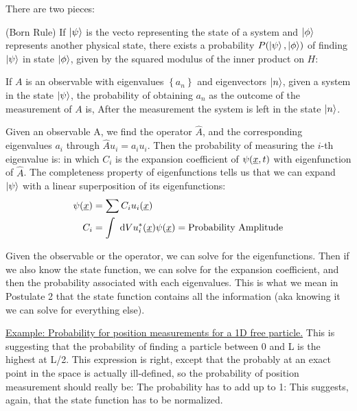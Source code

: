 \documentclass{school-22.101-notes}
\date{September 14, 2011}
\begin{document}
\maketitle


\begin{axiom}
There are two pieces:
\begin{subaxiom}
  (Born Rule) If $\left| \psi \right>$ is the vecto representing the state of a system and $\left| \phi \right>$ represents another physical state, there exists a probability $P(\left| \psi \right>, \left| \phi \right>)$ of finding $\left| \psi \right>$ in state $\left| \phi \right>$, given by the squared modulus of the inner product on $H$:
\end{subaxiom}
\begin{subaxiom}
  If $A$ is an observable with eigenvalues $\left\{ a_n \right\}$ and eigenvectors $\left| n \right>$, given a system in the state $\left| \psi \right>$, the probability of obtaining $a_n$ as the outcome of the measurement of $A$ is, 
  After the measurement the system is left in the state $\left| n \right>$.
\end{subaxiom}
\end{axiom}

Given an observable A, we find the operator $\hat{A}$, and the corresponding eigenvalues $a_i$ through $\hat{A} u_i = a_i u_i$. Then the probability of measuring the $i$-th eigenvalue is:
in which $C_i$ is the expansion coefficient of $\psi(\underline{x}, t)$ with eigenfunction of $\hat{A}$. The completeness property of eigenfunctions tells us that we can expand $\left| \psi \right>$ with a linear superposition of its eigenfunctions:
\begin{align}
\psi(\underline{x}) &= \displaystyle\sum C_i u_i (\underline{x}) \\
C_i &= \int \mbox{ }\mathrm{d} V u_i^* (\underline{x}) \psi(\underline{x}) = \mbox{Probability Amplitude}
\end{align}

Given the observable or the operator, we can solve for the eigenfunctions. Then if we also know the state function, we can solve for the expansion coefficient, and then the probability associated with each eigenvalues. This is what we mean in Postulate 2 that the state function contains all the information (aka knowing it we can solve for everything else). 

\uline{Example: Probability for position measurements for a 1D free particle.} 
This is suggesting that the probability of finding a particle between 0 and L is the highest at L/2. This expression is right, except that the probably at an exact point in the space is actually ill-defined, so the probability of position measurement should really be:
The probability has to add up to 1: 
This suggests, again, that the state function has to be normalized. 
\end{document}
